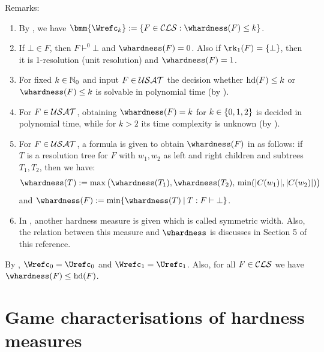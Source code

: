 \documentclass{report}
\begin{document}
Remarks:
  \begin{enumerate}
  \item By \cite{BeyersdorffKullmann2014PHP}, we have $\bmm{\Wrefc_k}:= \set{F \in \Cls : \whardness(F) \le k}$. 
  \item If $\bot \in F$, then $F \vdash^0 \bot$ and $\whardness(F)=0$. Also if $\rk_1(F)=\set{\bot}$, then it is 1-resolution (unit resolution) and  $\whardness(F)=1$.
  \item For fixed $k \in \mathbb{N}_0$ and input $F \in \mathcal{USAT}$ the decision whether $\operatorname{hd}(F) \le k$ or $\whardness(F) \le k$ is solvable in polynomial time (by \cite{BeyersdorffKullmann2014PHP}). 
  \item For $F \in \mathcal{USAT}$, obtaining $\whardness(F) = k$ for $k \in \{ 0,1,2 \}$ is decided in polynomial time, while for $k > 2$ its time complexity is unknown (by \cite{GwynneKullmann2013GoodRepresentationsIIex}).
  \item For $F \in \mathcal{USAT}$, a formula is given to obtain $\whardness(F)$ in \cite{BeyersdorffGwynneKullmann2013PHPER} as follows: if $T$ is a resolution tree for $F$ with $w_1, w_2$ as left and right children and subtrees $T_1, T_2$, then we have:
  \begin{displaymath}
  \whardness(T) := \max \big (\whardness(T_1), \whardness(T_2), \, \min(\abs{C(w_1)}, \abs{C(w_2)}) \big )
  \end{displaymath}
  and $\whardness(F) := \min \set{\whardness(T) \mb T : F \vdash \bot}$.
  \item In \cite{BeyersdorffGwynneKullmann2013PHPER}, another hardness measure is given which is called symmetric width. Also, the relation between this measure and $\whardness$ is discusses in Section 5 of this reference.
  \end{enumerate}
  
\begin{lem}\label{lem:hd-whd}
By \cite{BeyersdorffKullmann2014PHP}, $\Wrefc_0 = \Urefc_0$ and $\Wrefc_1 = \Urefc_1$. Also, for all $F \in \mathcal{CLS}$ we have $\whardness(F) \le \hardness(F)$.
\end{lem}
\section{Game characterisations of hardness measures}
\label{sec:game-pd}
\end{document}
